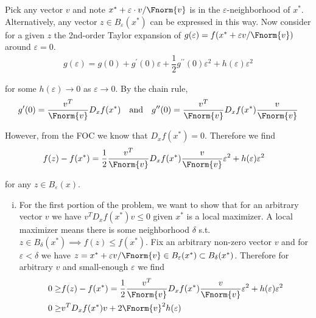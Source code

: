 \documentclass{article}
\begin{document}
\begin{enumerate}[1.]
\begin{enumerate}[a)]
        \solution Pick any vector $v$ and note $x^* + \varepsilon \cdot v / \Fnorm{v}$ is in the $\varepsilon$-neighborhood of $x^*$. Alternatively, any vector $z \in B_{\varepsilon}(x^*)$ can be expressed in this way. Now consider for a given $z$ the 2nd-order Taylor expansion of $g(\varepsilon) = f(x^* + \varepsilon v / \Fnorm{v})$ around $\varepsilon = 0$.
        \begin{align*}
          g(\varepsilon)
          =
          g(0)
          + g^\prime(0) \varepsilon
          + \dfrac{1}{2} g^{\prime\prime}(0) \varepsilon^2
          + h(\varepsilon) \varepsilon^2
        \end{align*}

        for some $h(\varepsilon) \to 0$ as $\varepsilon \to 0$. By the chain rule,
        \begin{align*}
          g^{\prime}(0)
          =
          \dfrac{v^T}{\Fnorm{v}} D_x f(x^*)
          \quad\text{and}\quad
          g^{\prime\prime}(0)
          =
          \dfrac{v^T}{\Fnorm{v}} D_x f(x^*) \dfrac{v}{\Fnorm{v}}
        \end{align*}

        However, from the FOC we know that $D_x f(x^*) = 0$.  Therefore we find
        \begin{align*}
          f(z) - f(x^*)
          &
          =
          \dfrac{1}{2}
          \dfrac{v^T}{\Fnorm{v}} D_x f(x^*) \dfrac{v}{\Fnorm{v}} \varepsilon^2
          +
          h(\varepsilon) \varepsilon^2
        \end{align*}

        for any $z \in B_{\varepsilon}(x)$.
        \begin{enumerate}[i)]
          \item For the first portion of the problem, we want to show that for an arbitrary vector $v$ we have $v^T D_x f(x^*) v \le 0$ given $x^*$ is a local maximizer. A local maximizer means there is some neighborhood $\delta$ s.t. $z \in B_{\delta}(x^*) \implies f(z) \le f(x^*)$. Fix an arbitrary non-zero vector $v$ and for $\varepsilon < \delta$ we have $z = x^* + \varepsilon v / \Fnorm{v} \in B_{\varepsilon}(x^*) \subset B_{\delta}(x^*)$. Therefore for arbitrary $v$ and small-enough $\varepsilon$ we find
            \begin{align*}
              0
              \ge
              &
              f(z) - f(x^*)
              =
              \dfrac{1}{2}
              \dfrac{v^T}{\Fnorm{v}} D_x f(x^*) \dfrac{v}{\Fnorm{v}} \varepsilon^2
              +
              h(\varepsilon) \varepsilon^2
              \\
              0
              \ge
              &
              v^T D_x f(x^*) v
              +
              2 \Fnorm{v}^2 h(\varepsilon)
            \end{align*}


\end{enumerate}
\end{enumerate}
\end{enumerate}
\end{document}
